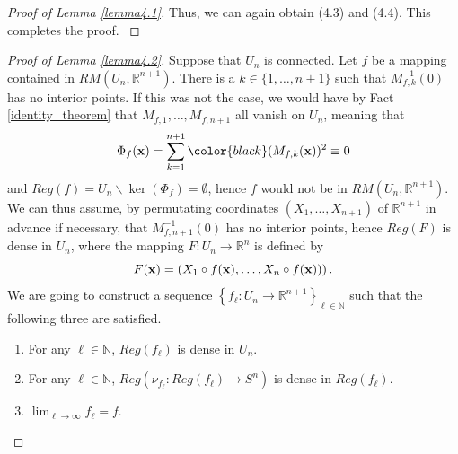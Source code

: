 \documentclass{amsart}
\theoremstyle{definition}
\theoremstyle{definition}
\theoremstyle{definition}
\newcommand{\ch}[1]{{\color{black} #1}}
\begin{document}
{\begin{proof}[Proof of Lemma \ref{lemma4.1}]
{Thus, we can again obtain (4.3) and (4.4).  
This completes the proof.   
}
\end{proof}   
\bigskip 
{\color{black} 
\begin{proof}[Proof of Lemma \ref{lemma4.2}]         
{\color{black} 
Suppose that $U_n$ is connected.   
Let $f$ be a mapping contained in $RM(U_n, \mathbb{R}^{n+1})$.
\ch{There is a $k\in\{1,\ldots,n+1\}$ such that $M_{f,k}^{-1}(0)$ has no interior points.
If this was not the case, we would have by Fact \ref{identity_theorem} that $M_{f,1},\dots,M_{f,n+1}$ all vanish on $U_n$, meaning that
	\[\Phi_f({\bf x})= \sum_{k=1}^{n+1}\ch{(M_{f, k}({\bf x}))^2}\equiv 0\]
and $Reg(f)=U_n\backslash \ker(\Phi_f)=\emptyset$, hence $f$ would not be in $RM(U_n,\mathbb{R}^{n+1})$.
We can thus assume,}
by permutating coordinates $\left(X_1, \ldots, X_{n+1}\right)$ 
of $\mathbb{R}^{n+1}$ in advance if necessary, that
\ch{$M_{f,{n+1}}^{-1}(0)$ has no interior points, hence}
$Reg(F)$ is %
dense in $U_n$,      
where the mapping $F: U_n\to \mathbb{R}^n$ is defined by 
\[
F({\bf x})= \left(X_1\circ f({\bf x}), \ldots, X_n\circ f({\bf x}))\right).   
\]
We \ch{are going to} construct a sequence 
$\left\{f_\ell: U_n\to \mathbb{R}^{n+1}\right\}_{\ell\in \mathbb{N}}$ 
such that the following three are satisfied.    
\smallskip 
\begin{enumerate}
\item[$(4.A)$] For any $\ell\in \mathbb{N}$, 
$Reg\left(f_\ell\right)$ is %
dense in $U_n$.       
\item[$(4.B)$] For any $\ell\in \mathbb{N}$, 
$Reg\left(\nu_{f_\ell}: Reg\left(f_\ell\right)\to S^n\right)$ is 
dense in $Reg\left(f_\ell\right)$.    
\item[$(4.C)$] $\lim_{\ell\to \infty}f_\ell=f$.   
\end{enumerate}
\par 
\smallskip 
}
\end{proof}}}
\end{document}
